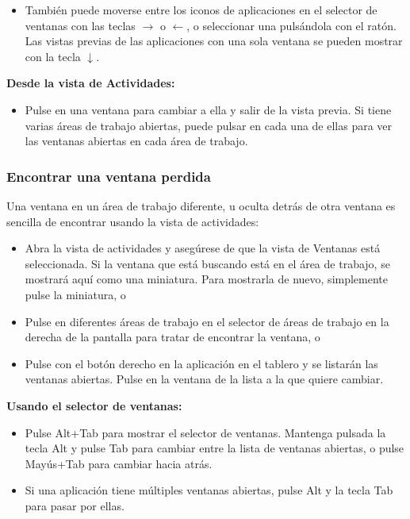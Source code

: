 \begin{itemize}
\item También puede moverse entre los iconos de aplicaciones en el selector de ventanas con las teclas $→$ o $←$, o seleccionar una pulsándola con el ratón.\\
Las vistas previas de las aplicaciones con una sola ventana se pueden mostrar con la tecla $↓$.
\end{itemize}
{\bf Desde la vista de Actividades:}
\begin{itemize}
\item Pulse en una ventana para cambiar a ella y salir de la vista previa. Si tiene varias áreas de trabajo abiertas, puede pulsar en cada una de ellas para ver las ventanas abiertas en cada área de trabajo.
\end{itemize}
\subsubsection{Encontrar una ventana perdida}
Una ventana en un área de trabajo diferente, u oculta detrás de otra ventana es sencilla de encontrar usando la vista de actividades:
\begin{itemize}
\item Abra la vista de actividades y asegúrese de que la vista de Ventanas está seleccionada. Si la ventana que está buscando está en el área de trabajo, se mostrará aquí como una miniatura. Para mostrarla de nuevo, simplemente pulse la miniatura, o
\item Pulse en diferentes áreas de trabajo en el selector de áreas de trabajo en la derecha de la pantalla para tratar de encontrar la ventana, o
\item Pulse con el botón derecho en la aplicación en el tablero y se listarán las ventanas abiertas. Pulse en la ventana de la lista a la que quiere cambiar.
\end{itemize}

{\bf Usando el selector de ventanas:}
\begin{itemize}
\item Pulse Alt+Tab para mostrar el selector de ventanas. Mantenga pulsada la tecla Alt y pulse Tab para cambiar entre la lista de ventanas abiertas, o pulse Mayús+Tab para cambiar hacia atrás.
\item Si una aplicación tiene múltiples ventanas abiertas, pulse Alt y la tecla Tab para pasar por ellas.
\end{itemize}
